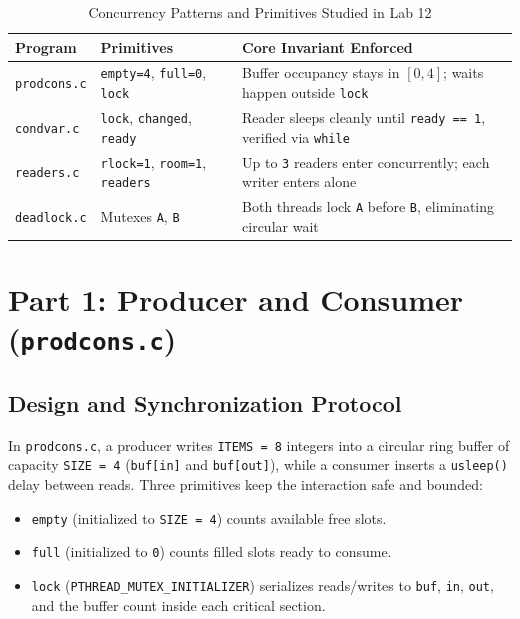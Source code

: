 \documentclass[12pt,a4paper]{article}
\begin{document}
\begin{table}[H]
\centering
\caption{Concurrency Patterns and Primitives Studied in Lab 12}
\label{tab:patterns}
\begin{tabularx}{\textwidth}{l l >{\raggedright\arraybackslash}X}
\toprule
\textbf{Program} & \textbf{Primitives} & \textbf{Core Invariant Enforced} \\
\midrule
\texttt{prodcons.c} & \texttt{empty=4}, \texttt{full=0}, \texttt{lock} & Buffer occupancy stays in \([0, 4]\); waits happen outside \texttt{lock} \\
\texttt{condvar.c} & \texttt{lock}, \texttt{changed}, \texttt{ready} & Reader sleeps cleanly until \texttt{ready == 1}, verified via \texttt{while} \\
\texttt{readers.c} & \texttt{rlock=1}, \texttt{room=1}, \texttt{readers} & Up to \texttt{3} readers enter concurrently; each writer enters alone \\
\texttt{deadlock.c} & Mutexes \texttt{A}, \texttt{B} & Both threads lock \texttt{A} before \texttt{B}, eliminating circular wait \\
\bottomrule
\end{tabularx}
\end{table}

\section{Part 1: Producer and Consumer (\texttt{prodcons.c})}

\subsection{Design and Synchronization Protocol}
In \texttt{prodcons.c}, a producer writes \texttt{ITEMS = 8} integers into a circular ring buffer of capacity \texttt{SIZE = 4} (\texttt{buf[in]} and \texttt{buf[out]}), while a consumer inserts a \texttt{usleep()} delay between reads. Three primitives keep the interaction safe and bounded:
\begin{itemize}
    \item \texttt{empty} (initialized to \texttt{SIZE = 4}) counts available free slots.
    \item \texttt{full} (initialized to \texttt{0}) counts filled slots ready to consume.
    \item \texttt{lock} (\texttt{PTHREAD\_\allowbreak MUTEX\_\allowbreak INITIALIZER}) serializes reads/writes to \texttt{buf}, \texttt{in}, \texttt{out}, and the buffer count inside each critical section.
\end{itemize}
\end{document}
